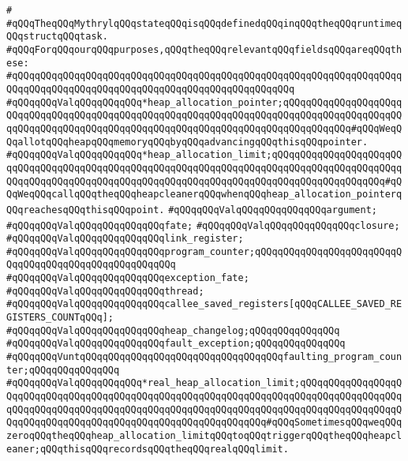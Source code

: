 \verb|#|\newline
\verb|#qQQqTheqQQqMythrylqQQqstateqQQqisqQQqdefinedqQQqinqQQqtheqQQqruntimeqQQqstructqQQqtask.|\newline
\verb|#qQQqForqQQqourqQQqpurposes,qQQqtheqQQqrelevantqQQqfieldsqQQqareqQQqthese:|\newline
\verb|#qQQqqQQqqQQqqQQqqQQqqQQqqQQqqQQqqQQqqQQqqQQqqQQqqQQqqQQqqQQqqQQqqQQqqQQqqQQqqQQqqQQqqQQqqQQqqQQqqQQqqQQqqQQqqQQqqQQqqQQq|\newline
\verb|#qQQqqQQqValqQQqqQQqqQQq*heap_allocation_pointer;qQQqqQQqqQQqqQQqqQQqqQQqqQQqqQQqqQQqqQQqqQQqqQQqqQQqqQQqqQQqqQQqqQQqqQQqqQQqqQQqqQQqqQQqqQQqqQQqqQQqqQQqqQQqqQQqqQQqqQQqqQQqqQQqqQQqqQQqqQQqqQQqqQQqqQQq#qQQqWeqQQqallotqQQqheapqQQqmemoryqQQqbyqQQqadvancingqQQqthisqQQqpointer.|\newline
\verb|#qQQqqQQqValqQQqqQQqqQQq*heap_allocation_limit;qQQqqQQqqQQqqQQqqQQqqQQqqQQqqQQqqQQqqQQqqQQqqQQqqQQqqQQqqQQqqQQqqQQqqQQqqQQqqQQqqQQqqQQqqQQqqQQqqQQqqQQqqQQqqQQqqQQqqQQqqQQqqQQqqQQqqQQqqQQqqQQqqQQqqQQqqQQqqQQq#qQQqWeqQQqcallqQQqtheqQQqheapcleanerqQQqwhenqQQqheap_allocation_pointerqQQqreachesqQQqthisqQQqpoint.|\newline
\verb|#qQQqqQQqValqQQqqQQqqQQqqQQqargument;|\newline
\verb|#qQQqqQQqValqQQqqQQqqQQqqQQqfate;|\newline
\verb|#qQQqqQQqValqQQqqQQqqQQqqQQqclosure;|\newline
\verb|#qQQqqQQqValqQQqqQQqqQQqqQQqlink_register;|\newline
\verb|#qQQqqQQqValqQQqqQQqqQQqqQQqprogram_counter;qQQqqQQqqQQqqQQqqQQqqQQqqQQqqQQqqQQqqQQqqQQqqQQqqQQqqQQq|\newline
\verb|#qQQqqQQqValqQQqqQQqqQQqqQQqexception_fate;|\newline
\verb|#qQQqqQQqValqQQqqQQqqQQqqQQqthread;|\newline
\verb|#qQQqqQQqValqQQqqQQqqQQqqQQqcallee_saved_registers[qQQqCALLEE_SAVED_REGISTERS_COUNTqQQq];|\newline
\verb|#qQQqqQQqValqQQqqQQqqQQqqQQqheap_changelog;qQQqqQQqqQQqqQQq|\newline
\verb|#qQQqqQQqValqQQqqQQqqQQqqQQqfault_exception;qQQqqQQqqQQqqQQq|\newline
\verb|#qQQqqQQqVuntqQQqqQQqqQQqqQQqqQQqqQQqqQQqqQQqqQQqfaulting_program_counter;qQQqqQQqqQQqqQQq|\newline
\verb|#qQQqqQQqValqQQqqQQqqQQq*real_heap_allocation_limit;qQQqqQQqqQQqqQQqqQQqqQQqqQQqqQQqqQQqqQQqqQQqqQQqqQQqqQQqqQQqqQQqqQQqqQQqqQQqqQQqqQQqqQQqqQQqqQQqqQQqqQQqqQQqqQQqqQQqqQQqqQQqqQQqqQQqqQQqqQQqqQQqqQQqqQQqqQQqqQQqqQQqqQQqqQQqqQQqqQQqqQQqqQQqqQQqqQQqqQQqqQQq#qQQqSometimesqQQqweqQQqzeroqQQqtheqQQqheap_allocation_limitqQQqtoqQQqtriggerqQQqtheqQQqheapcleaner;qQQqthisqQQqrecordsqQQqtheqQQqrealqQQqlimit.|\newline
